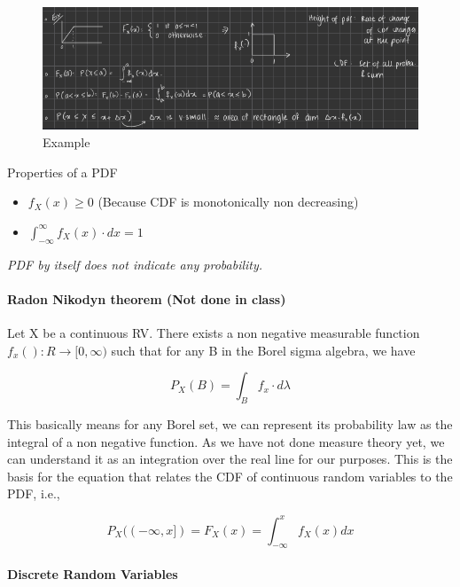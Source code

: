 \begin{figure}[''h!'']
\centering
\includegraphics{Screenshot_from_2021-08-07_11-45-20.png}
\caption{Example}
\end{figure}

Properties of a PDF

\begin{itemize}
\tightlist
\item
  \(f_X(x) \geq 0\) (Because CDF is monotonically non decreasing)
\item
  \(\displaystyle\int_{-\infty}^{\infty}f_X(x)\cdot dx = 1\)
\end{itemize}

\emph{PDF by itself does not indicate any probability.}

\hypertarget{radon-nikodyn-theorem-not-done-in-class}{%
\paragraph{Radon Nikodyn theorem (Not done in
class)}\label{radon-nikodyn-theorem-not-done-in-class}}

Let X be a continuous RV. There exists a non negative measurable
function \(f_x() : R \to [0, \infty)\) such that for any B in the Borel
sigma algebra, we have

\[P_X(B) = \displaystyle\int_{B} f_x\cdot d\lambda\]

This basically means for any Borel set, we can represent its probability
law as the integral of a non negative function. As we have not done
measure theory yet, we can understand it as an integration over the real
line for our purposes. This is the basis for the equation that relates
the CDF of continuous random variables to the PDF, i.e.,

\[P_X((-\infty, x]) = F_X(x) = \displaystyle\int_{-\infty}^{x} f_X(x) dx\]

\hypertarget{discrete-random-variables}{%
\paragraph{Discrete Random Variables}\label{discrete-random-variables}}

